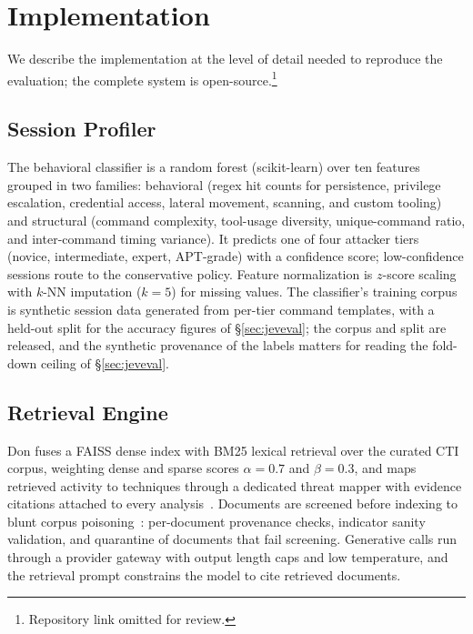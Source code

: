 \section{Implementation}
\label{sec:implementation}

We describe the implementation at the level of detail needed to reproduce
the evaluation; the complete system is open-source.\footnote{Repository
link omitted for review.}

\subsection{Session Profiler}
The behavioral classifier is a random forest (scikit-learn) over ten
features grouped in two families: behavioral (regex hit counts for
persistence, privilege escalation, credential access, lateral movement,
scanning, and custom tooling) and structural (command complexity,
tool-usage diversity, unique-command ratio, and inter-command timing
variance). It predicts one of four attacker tiers (novice, intermediate,
expert, APT-grade) with a confidence score; low-confidence sessions route
to the conservative policy. Feature normalization is $z$-score scaling
with $k$-NN imputation ($k{=}5$) for missing values. The classifier's
training corpus is synthetic session data generated from
per-tier command templates, with a held-out split for the accuracy
figures of \S\ref{sec:jeveval}; the corpus and split are released, and
the synthetic provenance of the labels matters for reading the
fold-down ceiling of \S\ref{sec:jeveval}.

\subsection{Retrieval Engine}
Don fuses a FAISS dense index with BM25 lexical retrieval over the curated
CTI corpus, weighting dense and sparse scores $\alpha{=}0.7$ and
$\beta{=}0.3$, and maps retrieved activity to \attck techniques through a
dedicated threat mapper with evidence citations attached to every
analysis~\cite{fayyazi2023}. Documents are screened before indexing to
blunt corpus
poisoning~\cite{chaudhari2024,jia2025,xue2024,shafran2024}:
per-document provenance checks,
indicator sanity validation, and quarantine of documents that fail
screening. Generative calls run through a provider gateway with output
length caps and low temperature, and the retrieval prompt constrains the
model to cite retrieved documents.

